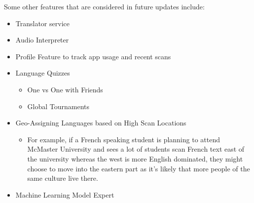 Some other features that are considered in future updates include: 
\begin{itemize}
    \item Translator service
    \item Audio Interpreter
    \item Profile Feature to track app usage and recent scans 
    \item Language Quizzes
    \begin{itemize}
        \item One vs One with Friends 
        \item Global Tournaments
    \end{itemize}
    \item Geo-Assigning Languages based on High Scan Locations 
    \begin{itemize}
        \item For example, if a French speaking student is planning to attend McMaster University and sees a lot of students scan French text east of the university whereas the west is more English dominated, they might choose to move into the eastern part as it's likely that more people of the same culture live there. 
    \end{itemize}
    \item Machine Learning Model Expert
\end{itemize}

